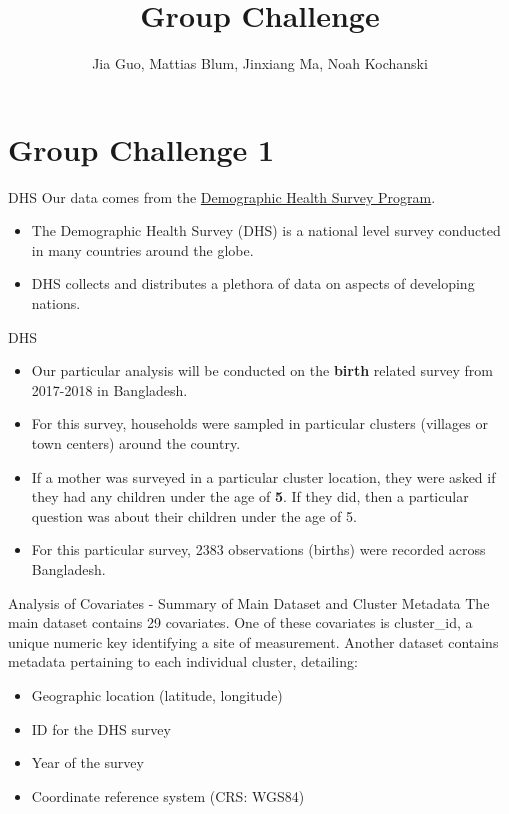 \documentclass[
  ignorenonframetext,
]{beamer}
\title{Group Challenge}
\author{Jia Guo, Mattias Blum, Jinxiang Ma, Noah Kochanski}
\date{}
\providecommand{\tightlist}{%
  \setlength{\itemsep}{0pt}\setlength{\parskip}{0pt}}\usepackage{longtable,booktabs,array}
\begin{document}
\frame{\titlepage}


\section{Group Challenge 1}\label{group-challenge-1}

\begin{frame}{DHS}
\label{dhs}
Our data comes from the \href{https://dhsprogram.com}{Demographic Health
Survey Program}.

\begin{itemize}
\tightlist
\item
  The Demographic Health Survey (DHS) is a national level survey
  conducted in many countries around the globe.
\item
  DHS collects and distributes a plethora of data on aspects of
  developing nations.
\end{itemize}
\end{frame}

\begin{frame}{DHS}
\label{dhs-1}
\begin{itemize}
\item
  Our particular analysis will be conducted on the \textbf{birth}
  related survey from 2017-2018 in Bangladesh.
\item
  For this survey, households were sampled in particular clusters
  (villages or town centers) around the country.
\item
  If a mother was surveyed in a particular cluster location, they were
  asked if they had any children under the age of \textbf{5}. If they
  did, then a particular question was about their children under the age
  of 5.
\item
  For this particular survey, 2383 observations (births) were recorded
  across Bangladesh.
\end{itemize}
\end{frame}

\begin{frame}{Analysis of Covariates - Summary of Main Dataset and
Cluster Metadata}
\label{analysis-of-covariates---summary-of-main-dataset-and-cluster-metadata}
The main dataset contains 29 covariates. One of these covariates is
cluster\_id, a unique numeric key identifying a site of measurement.
Another dataset contains metadata pertaining to each individual cluster,
detailing:

\begin{itemize}
\item
  Geographic location (latitude, longitude)
\item
  ID for the DHS survey
\item
  Year of the survey
\item
  Coordinate reference system (CRS: WGS84)
\end{itemize}
\end{frame}
\end{document}
